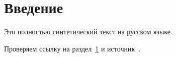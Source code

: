 \documentclass{gostcheck-vkr}
\begin{document}
\section{Введение}\label{sec:introduction}
Это полностью синтетический текст на русском языке.

Проверяем ссылку на раздел~\ref{sec:introduction}
и источник~\autocite{synthetic-standard}.
\printbibliography%
\end{document}
